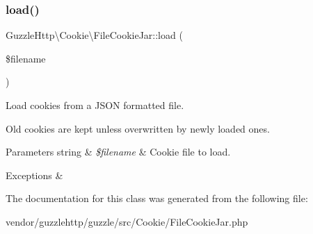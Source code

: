 \subsubsection{\texorpdfstring{load()}{load()}}
{\footnotesize\ttfamily Guzzle\+Http\textbackslash{}\+Cookie\textbackslash{}\+File\+Cookie\+Jar\+::load (\begin{DoxyParamCaption}\item[{}]{\$filename }\end{DoxyParamCaption})}

Load cookies from a J\+S\+ON formatted file.

Old cookies are kept unless overwritten by newly loaded ones.


\begin{DoxyParams}[1]{Parameters}
string & {\em \$filename} & Cookie file to load. \\
\hline
\end{DoxyParams}

\begin{DoxyExceptions}{Exceptions}
{\em } & \\
\hline
\end{DoxyExceptions}


The documentation for this class was generated from the following file\+:\begin{DoxyCompactItemize}
\item 
vendor/guzzlehttp/guzzle/src/\+Cookie/File\+Cookie\+Jar.\+php\end{DoxyCompactItemize}
